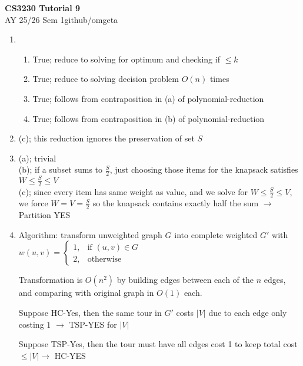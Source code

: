 \documentclass[12pt, a4paper]{article}
\newcommand{\mytitle}{CS3230 Tutorial 9}
\newcommand{\myauthor}{github/omgeta}
\newcommand{\mydate}{AY 25/26 Sem 1}
\begin{document}
\raggedright
\footnotesize
\begin{center}
{\normalsize{\textbf{\mytitle}}} \\
{\footnotesize{\mydate\hspace{2pt}\textemdash\hspace{2pt}\myauthor}}
\end{center}
\begin{enumerate}[Q\arabic*).]
  \item 
    \begin{enumerate}[(\alph*.)]
      \item True; reduce to solving for optimum and checking if $\leq k$
      \item True; reduce to solving decision problem $O(n)$ times
      \item True; follows from contraposition in (a) of polynomial-reduction
      \item True; follows from contraposition in (b) of polynomial-reduction
    \end{enumerate}

  \item (c); this reduction ignores the preservation of set $S$ 

  \item (a); trivial\\
    (b); if a subset sums to $\frac{S}{2}$, just choosing those items for the knapsack satisfies $W \leq \frac{S}{2} \leq V$\\
    (c); since every item has same weight as value, and we solve for $W \leq \frac{S}{2} \leq V$, we force $W = V = \frac{S}{2}$ so the knapsack contains exactly half the sum $\rightarrow$ Partition YES

  \item Algorithm: transform unweighted graph $G$ into complete weighted $G'$ with $w(u, v) = \begin{cases}1,&\text{if $(u, v)\in G$}\\2, &\text{otherwise}\end{cases}$

    Transformation is $O(n^2)$ by building edges between each of the $n$ edges, and comparing with original graph in $O(1)$ each.

    Suppose HC-Yes, then the same tour in $G'$ costs $|V|$ due to each edge only costing $1$ $\rightarrow$ TSP-YES for $|V|$

    Suppose TSP-Yes, then the tour must have all edges cost 1 to keep total cost $\leq |V| \rightarrow$ HC-YES
\end{enumerate}
\end{document}
